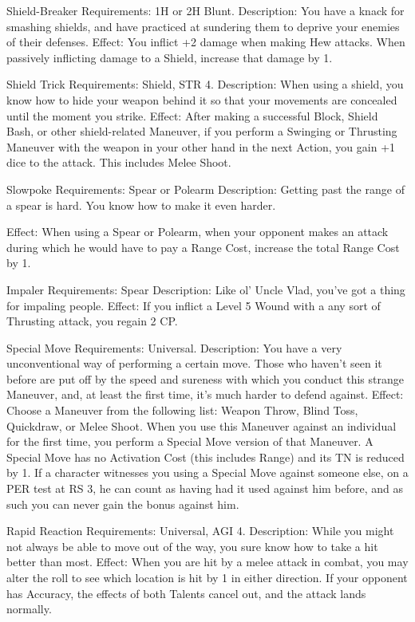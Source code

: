 \documentclass[oneside,11pt,english]{book}
\begin{document}
 

Shield-Breaker 
Requirements: 1H or 2H Blunt. 
Description: You have a knack for smashing shields, and have practiced at sundering them to deprive 
your enemies of their defenses. 
Effect: You inflict +2 damage when making Hew attacks. When passively inflicting damage to a Shield, 
increase that damage by 1. 

 

Shield Trick 
Requirements: Shield, STR 4. 
Description: When using a shield, you know how to hide your weapon behind it so that your movements 
are concealed until the moment you strike. 
Effect: After making a successful Block, Shield Bash, or other shield-related Maneuver, if you perform a 
Swinging or Thrusting Maneuver with the weapon in your other hand in the next Action, you gain +1 dice 
to the attack. This includes Melee Shoot. 

 

Slowpoke 
Requirements: Spear or Polearm 
Description: Getting past the range of a spear is hard. You know how to make it even harder. 


Effect: When using a Spear or Polearm, when your opponent makes an attack during which he would 
have to pay a Range Cost, increase the total Range Cost by 1. 

 

Impaler 
Requirements: Spear 
Description: Like ol’ Uncle Vlad, you’ve got a thing for impaling people. 
Effect: If you inflict a Level 5 Wound with a any sort of Thrusting attack, you regain 2 CP. 

 

Special Move 
Requirements: Universal. 
Description: You have a very unconventional way of performing a certain move. Those who haven't seen 
it before are put off by the speed and sureness with which you conduct this strange Maneuver, and, at 
least the first time, it's much harder to defend against. 
Effect: Choose a Maneuver from the following list: Weapon Throw, Blind Toss, Quickdraw, or Melee 
Shoot. When you use this Maneuver against an individual for the first time, you perform a Special Move 
version of that Maneuver. A Special Move has no Activation Cost (this includes Range) and its TN is 
reduced by 1. If a character witnesses you using a Special Move against someone else, on a PER test at 
RS 3, he can count as having had it used against him before, and as such you can never gain the bonus 
against him. 

 

Rapid Reaction 
Requirements: Universal, AGI 4. 
Description: While you might not always be able to move out of the way, you sure know how to take a 
hit better than most. 
Effect: When you are hit by a melee attack in combat, you may alter the roll to see which location is hit 
by 1 in either direction. If your opponent has Accuracy, the effects of both Talents cancel out, and the 
attack lands normally. 
\end{document}
